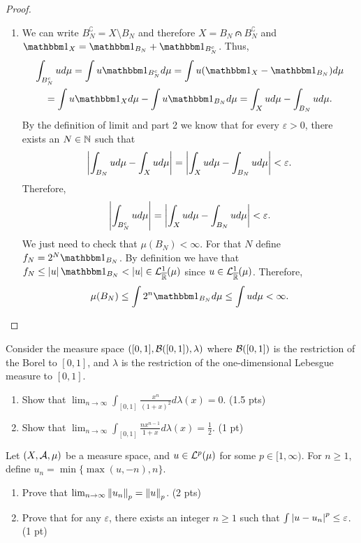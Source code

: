 \begin{proof}
\begin{enumerate}
		\item We can write $B_N^\complement = X \setminus B_N$ and therefore $X = B_N \capdot B_N^\complement$ and $\ind_X = \ind_{B_N} + \ind_{B_N^\complement}$. Thus,
		\begin{multline*}
			\int_{B_N^\complement} u d\mu 
			= \int u\ind_{B_N^\complement} d\mu
			= \int u (\ind_X - \ind_{B_N}) d\mu\\
			= \int u \ind_X d\mu - \int u \ind_{B_N} d\mu
			= \int_X u d\mu - \int_{B_N} u d\mu.
		\end{multline*}	
		By the definition of limit and part 2 we know that for every $\varepsilon > 0$, there exists an $N \in \mathbb{N}$ such that
		\begin{align*}
			\left\vert{\int_{B_N} u d\mu - \int_X u d\mu}\right\vert = \left\vert{ \int_X u d\mu - \int_{B_N} u d\mu}\right\vert < \varepsilon.
		\end{align*}
		Therefore,
		\begin{align*}
			\left\vert{\int_{B_N^c} u d\mu}\right\vert = \left\vert{\int_X u d\mu - \int_{B_N} u d\mu}\right\vert < \varepsilon.
		\end{align*}
		We just need to check that $\mu(B_N) < \infty$. For that $N$ define $f_N = 2^N \ind_{B_N}$. By definition we have that $f_N \leq \abs{u}\ind_{B_N} < \abs{u} \in \calL^1_\Rb(\mu)$ since $u \in \mathcal{L}^1_{\overline{\mathbb{R}}}(\mu)$. Therefore,
		\begin{align*}
			\mu(B_N) \leq \int 2^n\ind_{B_N}d\mu \leq \int u d\mu < \infty.
		\end{align*}
	\end{enumerate}
\end{proof}

\begin{ex}
	Consider the measure space $([0,1], \mathcal{B}([0, 1]), \lambda)$ where $\mathcal{B}([0,1])$ is the restriction of the Borel \siga to $[0,1]$, and $\lambda$ is the restriction of the one-dimensional Lebesgue measure to $[0,1]$.
	
	\begin{enumerate}
		\item Show that $\lim_{n \to \infty} \int_{[0,1]} \frac{x^n}{(1+ x)^2}d\lambda(x) = 0$. (1.5 pts)
		\item Show that $\lim_{n \to \infty} \int_{[0,1]} \frac{n x^{n-1}}{1 + x} d\lambda(x) = \frac{1}{2}$. (1 pt)
	\end{enumerate}
\end{ex}

\begin{ex}
	Let $(X, \mathcal{A}, \mu)$ be a measure space, and $u \in \mathcal{L}^p(\mu)$ for some $p \in [1, \infty)$. For $n \geq 1$, define $u_n = \min\{ \max(u, -n), n \}$.
	
	\begin{enumerate}
		\item Prove that $\lim_{n\to\infty} \left\Vert{u_n}\right\Vert_p = \left\Vert{u}\right\Vert_p$. (2 pts)
		\item Prove that for any $\varepsilon$, there exists an integer $n \geq 1$ such that $\int \left\vert{u - u_n}\right\vert^p \leq \varepsilon$. (1 pt)
	\end{enumerate}
\end{ex}

